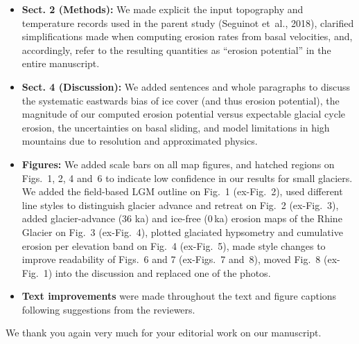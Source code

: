     \begin{itemize}

        \item \textbf{Sect. 2 (Methods):}
        We made explicit the input topography and temperature records used in
        the parent study (Seguinot et~al., 2018), clarified simplifications
        made when computing erosion rates from basal velocities, and,
        accordingly, refer to the resulting quantities as ``erosion potential''
        in the entire manuscript.

        \item \textbf{Sect. 4 (Discussion):}
        We added sentences and whole paragraphs to discuss the systematic
        eastwards bias of ice cover (and thus erosion potential), the magnitude
        of our computed erosion potential versus expectable glacial cycle
        erosion, the uncertainties on basal sliding, and model limitations in
        high mountains due to resolution and approximated physics.

        \item \textbf{Figures:}
        We added scale bars on all map figures, and hatched regions on Figs.~1,
        2, 4 and~6 to indicate low confidence in our results for small
        glaciers. We added the field-based LGM outline on Fig.~1 (ex-Fig.~2),
        used different line styles to distinguish glacier advance and retreat
        on Fig.~2 (ex-Fig.~3), added glacier-advance (36 ka) and ice-free
        (0\,ka) erosion maps of the Rhine Glacier on Fig.~3 (ex-Fig.~4),
        plotted glaciated hypsometry and cumulative erosion per elevation band
        on Fig.~4 (ex-Fig.~5), made style changes to improve readability of
        Figs.~6 and 7 (ex-Figs.~7 and~8), moved Fig.~8 (ex-Fig.~1) into the
        discussion and replaced one of the photos.

        \item \textbf{Text improvements}
        were made throughout the text and figure captions following suggestions
        from the reviewers.

    \end{itemize}

    We thank you again very much for your editorial work on our manuscript.


